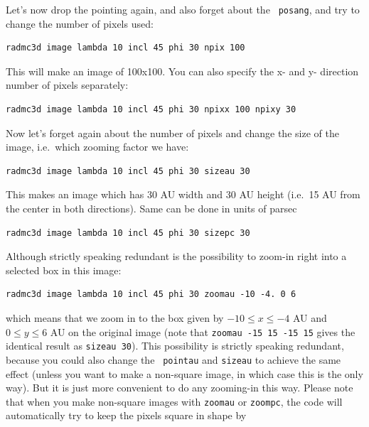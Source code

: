\documentclass{report}
\newenvironment{asciibox}%
  {\begin{list}{}{%
    \setlength{\topsep}{0.5em}%
    \setlength{\parskip}{0em}%
    \setlength{\parsep}{0em}%
    \setlength{\itemsep}{0em}%
    \setlength{\rightmargin}{0em}%
    \setlength{\leftmargin}{3.0em}%
    \setlength{\labelsep}{1em}%
    \setlength{\labelwidth}{2em}%
  }\normalfont\footnotesize\item}
  {\end{list}}
\begin{document}
Let's now drop the pointing again, and also forget about the {\small\tt
  posang}, and try to change the number of pixels used:
\begin{asciibox}\begin{verbatim}
radmc3d image lambda 10 incl 45 phi 30 npix 100
\end{verbatim}\end{asciibox}
This will make an image of 100x100. You can also specify the x- and y- 
direction number of pixels separately:
\begin{asciibox}\begin{verbatim}
radmc3d image lambda 10 incl 45 phi 30 npixx 100 npixy 30
\end{verbatim}\end{asciibox}
Now let's forget again about the number of pixels and change the size of the
image, i.e.\ which zooming factor we have:
\begin{asciibox}\begin{verbatim}
radmc3d image lambda 10 incl 45 phi 30 sizeau 30
\end{verbatim}\end{asciibox}
This makes an image which has 30 AU width and 30 AU height (i.e.\ 15 AU
from the center in both directions). Same can be done in units of parsec
\begin{asciibox}\begin{verbatim}
radmc3d image lambda 10 incl 45 phi 30 sizepc 30
\end{verbatim}\end{asciibox}
Although strictly speaking redundant is the possibility to zoom-in right
into a selected box in this image:
\begin{asciibox}\begin{verbatim}
radmc3d image lambda 10 incl 45 phi 30 zoomau -10 -4. 0 6
\end{verbatim}\end{asciibox}
which means that we zoom in to the box given by $-10\le x\le-4$ AU and $0\le
y\le 6$ AU on the original image (note that {\small\tt zoomau -15 15 -15 15}
gives the identical result as {\small\tt sizeau 30}). This possibility is
strictly speaking redundant, because you could also change the {\small\tt
  pointau} and {\small\tt sizeau} to achieve the same effect (unless you
want to make a non-square image, in which case this is the only way). But it
is just more convenient to do any zooming-in this way. Please note that when
you make non-square images with {\small\tt zoomau} or {\small\tt zoompc},
the code will automatically try to keep the pixels square in shape by
\end{document}
